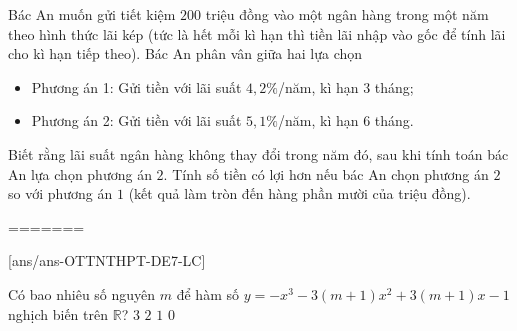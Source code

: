 \begin{ex}%
	Bác An muốn gửi tiết kiệm $200$ triệu đồng vào một ngân hàng trong một năm theo hình thức lãi kép (tức là hết mỗi kì hạn thì tiền lãi nhập vào gốc để tính lãi cho kì hạn tiếp theo). Bác An phân vân giữa hai lựa chọn
	\begin{itemize}
		\item Phương án 1: Gửi tiền với lãi suất $4{,}2\%$/năm, kì hạn $3$ tháng;
		\item Phương án 2: Gửi tiền với lãi suất $5{,}1\%$/năm, kì hạn $6$ tháng.
	\end{itemize}
	Biết rằng lãi suất ngân hàng không thay đổi trong năm đó, sau khi tính toán bác An lựa chọn phương án $2$. Tính số tiền có lợi hơn nếu bác An chọn phương án $2$ so với phương án $1$ (kết quả làm tròn đến hàng phần mười của triệu đồng).
	\par
\end{ex}
=======
\begin{name}
	{\tenchude}
	{\tendethi}
	{\tentruong}
	{\thoigian}
\end{name}
[ans/ans-OTTNTHPT-DE7-LC]
\caulc
\begin{ex}%
	Có bao nhiêu số nguyên $m$ để hàm số $y=-x^3-3(m+1)x^2+3(m+1)x-1$ nghịch biến trên $\mathbb{R}$?
	\choice
	{$3$}
	{\True $2$}
	{$1$}
	{$0$}
\end{ex}
